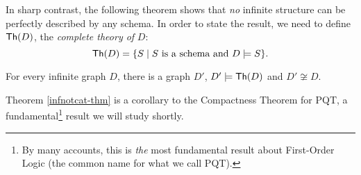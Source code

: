 In sharp contrast, the following theorem shows that \emph{no} infinite structure can be perfectly described by any schema. In order to state the result, we need to define $\mbox{${\mathsf{Th}}(D)$}$, the \emph{complete theory of} $D$:
\[
\mbox{${\mathsf{Th}}(D)$} = \{S\mid S \mbox{ is a schema and } D\models S\}. 
\]
\begin{theorem}\label{infnotcat-thm}
For every infinite graph $D$, there is a graph $D'$, $D'\models\mbox{${\mathsf{Th}}(D)$}$ and $D'\not\cong D$.
\end{theorem}
Theorem \ref{infnotcat-thm} is a corollary to the Compactness Theorem for PQT, a fundamental\footnote{By many accounts, this is \emph{the} most fundamental result about First-Order Logic (the common name for what we call PQT).} result we will study shortly.
\fi


